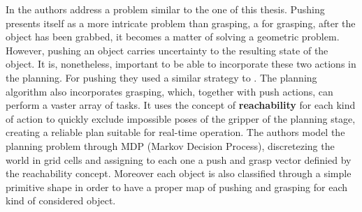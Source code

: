 

In \citep{coelhoplanning} the authors address a problem similar to the one of this thesis. Pushing presents itself as a more intricate problem than grasping, a for grasping, after the object has been grabbed, it becomes a matter of solving a geometric problem. However, pushing an object carries uncertainty to the resulting state of the object. It is, nonetheless, important to be able to incorporate these two actions in the planning.
For pushing they used a similar strategy to \citep{mericli2013achievable}.  The planning algorithm also incorporates grasping, which, together with push actions, can perform a vaster array of tasks. It uses the concept of \textbf{reachability} \citep{vahrenkamp2013robot} for each kind of action to quickly exclude impossible poses of the gripper of the planning stage, creating a reliable plan suitable for real-time operation. The authors model the planning problem through MDP (Markov Decision Process), discretezing the world in grid cells and assigning to each one a push and grasp vector definied by the reachability concept. Moreover each object is also classified through a simple primitive shape in order to have a proper map of pushing and grasping for each kind of considered object.


